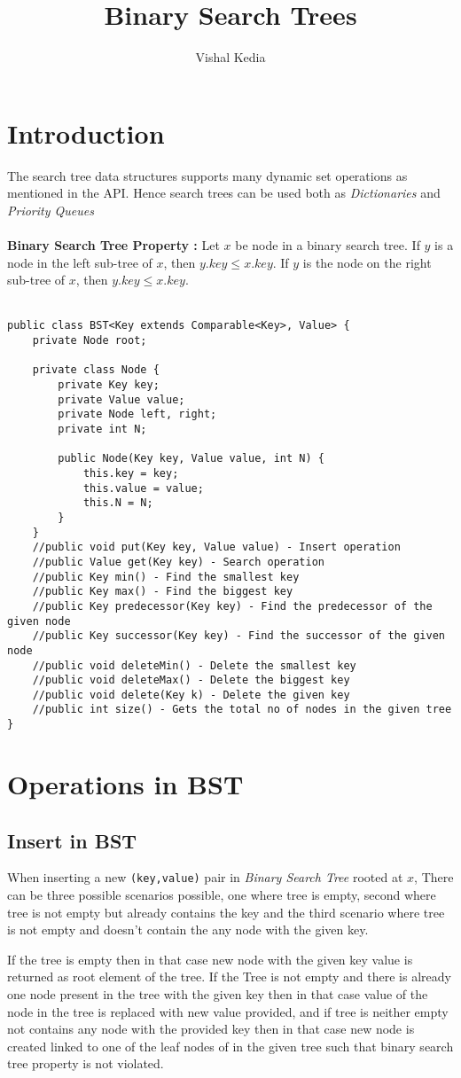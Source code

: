 \documentclass[12pt,a4paper,draft]{article}
\author{Vishal Kedia}
\title{Binary Search Trees}
\begin{document}
\maketitle
\section{Introduction}
The search tree data structures supports many dynamic set operations as mentioned in the API. Hence search trees can be used both as \emph{Dictionaries} and \emph{Priority Queues}
\\
\\
\textbf{Binary Search Tree Property :} Let $x$ be node in a binary search tree. If $y$ is a node in the left sub-tree of $x$, then $y.key \leq x.key$. If $y$ is the node on the right sub-tree of $x$, then $y.key \leq x.key$.
\\
\\
\begin{lstlisting}[caption={Binary Search Tree API}]
public class BST<Key extends Comparable<Key>, Value> {
	private Node root;

	private class Node {
		private Key key;
		private Value value;
		private Node left, right;
		private int N;

		public Node(Key key, Value value, int N) {
			this.key = key;
			this.value = value;
			this.N = N;
		}
	}
	//public void put(Key key, Value value) - Insert operation
	//public Value get(Key key) - Search operation
	//public Key min() - Find the smallest key
	//public Key max() - Find the biggest key
	//public Key predecessor(Key key) - Find the predecessor of the given node
	//public Key successor(Key key) - Find the successor of the given node
	//public void deleteMin() - Delete the smallest key
	//public void deleteMax() - Delete the biggest key
	//public void delete(Key k) - Delete the given key
	//public int size() - Gets the total no of nodes in the given tree
}
\end{lstlisting}
\pagebreak
\section{Operations in BST}
\subsection{Insert in BST}
When inserting a new \texttt{(key,value)} pair in \emph{Binary Search Tree} rooted at $x$, There can be three possible scenarios possible, one where tree is empty, second where tree is not empty but already contains the key and the third scenario where tree is not empty and doesn't contain the any node with the given key.
\par
If the tree is empty then in that case new node with the given key value is returned as root element of the tree. If the Tree is not empty and there is already one node present in the tree with the given key then in that case value of the node in the tree is replaced with new value provided, and if tree is neither empty not contains any node with the provided key then in that case new node is created linked to one of the leaf nodes of in the given tree such that binary search tree property is not violated.
\end{document}
